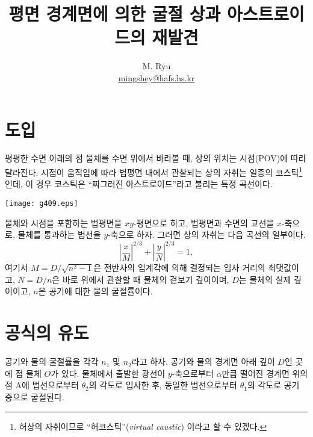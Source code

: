 \documentclass[twocolumn]{article}
\title{평면 경계면에 의한 굴절 상과 아스트로이드의 재발견}
\author{M. Ryu \\ {\href{mailto:mingshey@hafs.hs.kr}{mingshey@hafs.hs.kr}}}
\begin{document}
	\maketitle
	\section{도입}
	평평한 수면 아래의 점 물체를 수면 위에서 바라볼 때, 상의 위치는 시점(POV)에 따라 달라진다. 
	시점이 움직임에 따라 법평면 내에서 관찰되는 상의 자취는 일종의  코스틱\footnote{허상의 
	자취이므로 ``허코스틱''(\emph{virtual caustic}) 이라고 할 수 있겠다.}인데, 이 경우 
	코스틱은 ``찌그러진 아스트로이드''라고 불리는 특정 곡선이다.
	
	\texttt{[image: g409.eps]}
	
	물체와 시점을 포함하는 법평면을 $xy$-평면으로 하고, 법평면과 수면의 교선을 $x$-축으로, 
	물체를 통과하는 법선을 $y$-축으로 하자. 그러면 상의 자취는 다음 곡선의 일부이다.
	$$ \left| \dfrac{x}{M} \right| ^ {2/3} 
	+ \left| \dfrac{y}{N} \right| ^ {2/3} = 1,$$
	여기서 $M = D/\sqrt{n^2 - 1}$은 전반사의 임계각에 의해 결정되는 입사 거리의 최댓값이고, 
	$N = D/n$은 바로 위에서 관찰할 때 물체의 겉보기 깊이이며, 
	$D$는 물체의 실제 깊이이고, $n$은 공기에 대한 물의 굴절률이다.
	
	\section{공식의 유도}
	
	공기와 물의 굴절률을 각각 $n_1$ 및 $n_2$라고 하자. 공기와 물의 경계면 아래 깊이 $D$인 곳에 점 물체 $O$가 있다. 
	물체에서 출발한 광선이 $y$-축으로부터 $\alpha$만큼 떨어진 경계면 위의 점 A에 
	법선으로부터 $\theta_2$의 각도로 입사한 후, 동일한 법선으로부터 $\theta_1$의 각도로 공기 중으로 굴절된다.
	
\end{document}

